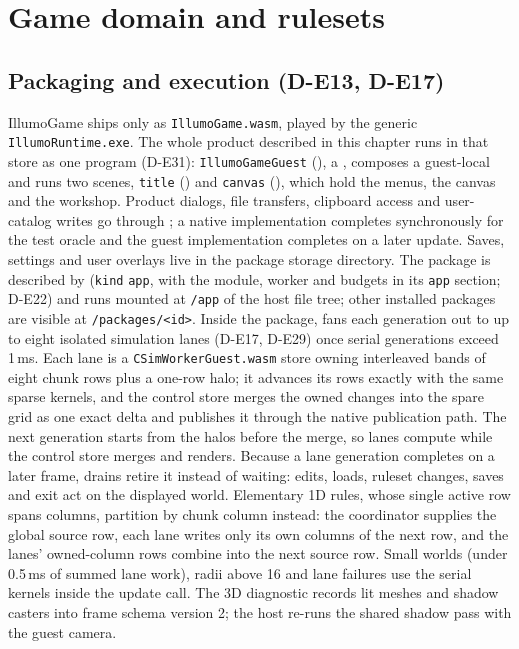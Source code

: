 \section{Game domain and rulesets}
\label{sec:game}

\subsection{Packaging and execution (D-E13, D-E17)}

IllumoGame ships only as \texttt{IllumoGame.wasm}, played by the generic
\texttt{IllumoRuntime.exe}. The whole product described in this chapter runs in
that store as one program (D-E31): \texttt{IllumoGameGuest}
(), a
, composes a guest-local  and
runs two scenes, \texttt{title} () and \texttt{canvas}
(), which hold the menus, the canvas and the workshop.
Product dialogs, file transfers, clipboard access and user-catalog writes go through
; a native implementation completes synchronously for
the test oracle and the guest implementation completes on a later update.
Saves, settings and user overlays live in the package storage directory. The
package is described by  (\texttt{kind}
\texttt{app}, with the module, worker and budgets in its \texttt{app} section;
D-E22) and runs mounted at \texttt{/app} of the host file tree; other
installed packages are visible at \texttt{/packages/<id>}.
Inside the package,  fans each generation out to
up to eight isolated simulation lanes (D-E17, D-E29) once serial generations
exceed 1\,ms. Each lane is a \texttt{CSimWorkerGuest.wasm} store owning interleaved
bands of eight chunk rows plus a one-row halo; it advances its rows exactly
with the same sparse kernels, and the control store merges the owned changes
into the spare grid as one exact delta and publishes it through the native
publication path. The next generation starts from the halos before the merge,
so lanes compute while the control store merges and renders. Because a lane
generation completes on a later frame, drains retire it instead of waiting:
edits, loads, ruleset changes, saves and exit act on the displayed world.
Elementary 1D rules, whose single active row spans columns, partition by chunk
column instead: the coordinator supplies the global source row, each lane writes
only its own columns of the next row, and the lanes' owned-column rows combine
into the next source row. Small worlds (under 0.5\,ms of summed lane work),
radii above 16 and lane failures use the serial kernels inside the update call. The 3D diagnostic records lit meshes
and shadow casters into frame schema version 2; the host re-runs the shared
shadow pass with the guest camera.

